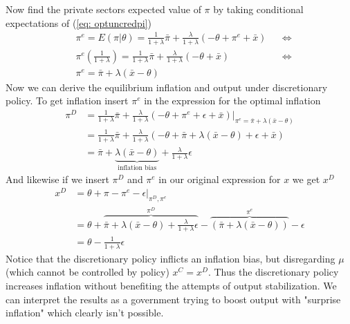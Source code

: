 \documentclass[12pt, a4paper]{article}
\begin{document}
\begin{spacing}{1.213}
\begin{equation}
\end{equation}
Now find the private sectors expected value of $\pi$ by taking conditional expectations of (\ref{eq: optuncredpi})
\begin{align*}
&\pi^e = E(\pi|\theta) = \frac{1}{1+ \lambda} \bar{\pi} + \frac{\lambda}{1+ \lambda}(- \theta + \pi^e + \bar{x}) && \Leftrightarrow \\ 
&\pi^e \left( \frac{1}{1+ \lambda} \right)= \frac{1}{1+ \lambda} \bar{\pi} + \frac{\lambda}{1+ \lambda}(- \theta + \bar{x}) && \Leftrightarrow \\
& \pi^e =\bar{\pi} + \lambda(\bar{x} - \theta) 
\end{align*}
Now we can derive the equilibrium inflation and output under discretionary policy. To get inflation insert $\pi^e$ in the expression for the optimal inflation
\begin{align*}
\pi^D &= \frac{1}{1+ \lambda} \bar{\pi} + \frac{\lambda}{1+ \lambda}(- \theta + \pi^e + \epsilon + \bar{x}) \bigg|_{\pi^e =\bar{\pi} + \lambda(\bar{x} - \theta) } \\ 
& = \frac{1}{1+ \lambda} \bar{\pi} + \frac{\lambda}{1+ \lambda}(- \theta + \bar{\pi} + \lambda(\bar{x} - \theta) + \epsilon + \bar{x}) \\
& = \bar{\pi} + \underbrace{\lambda(\bar{x}- \theta)}_{\textrm{inflation bias}} + \frac{\lambda}{1+ \lambda} \epsilon
\end{align*}
And likewise if we insert $\pi^D$ and $\pi^e$ in our original expression for $x$ we get $x^D$
\begin{align*}
x^D &= \theta + \pi - \pi^e - \epsilon \big|_{\pi^D, \pi^e} \\
&= \theta +  \overbrace{\bar{\pi} + \lambda(\bar{x}- \theta) + \frac{\lambda}{1+ \lambda} \epsilon}^{\pi^D} - \overbrace{(\bar{\pi}+ \lambda(\bar{x} - \theta))}^{\pi^e} - \epsilon \\
& = \theta - \frac{1}{1+\lambda} \epsilon
\end{align*}
Notice that the discretionary policy inflicts an inflation bias, but disregarding $\mu$ (which cannot be controlled by policy) $x^C = x^D$. Thus the discretionary policy increases inflation without benefiting the attempts of output stabilization. We can interpret the results as a government trying to boost output with "surprise inflation" which clearly isn't possible.  



\end{spacing}
\end{document}
